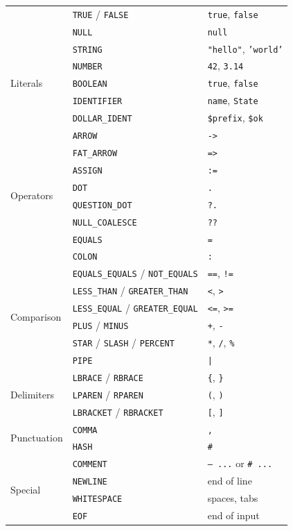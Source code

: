 \documentclass[11pt,a4paper]{article}
\begin{document}
\begin{center}
\begin{tabular}{@{}lll@{}}
& \texttt{TRUE} / \texttt{FALSE} & \texttt{true}, \texttt{false} \\
& \texttt{NULL} & \texttt{null} \\
\midrule
\multirow{5}{*}{Literals}
& \texttt{STRING} & \texttt{"hello"}, \texttt{'world'} \\
& \texttt{NUMBER} & \texttt{42}, \texttt{3.14} \\
& \texttt{BOOLEAN} & \texttt{true}, \texttt{false} \\
& \texttt{IDENTIFIER} & \texttt{name}, \texttt{State} \\
& \texttt{DOLLAR\_IDENT} & \texttt{\$prefix}, \texttt{\$ok} \\
\midrule
\multirow{8}{*}{Operators}
& \texttt{ARROW} & \texttt{->} \\
& \texttt{FAT\_ARROW} & \texttt{=>} \\
& \texttt{ASSIGN} & \texttt{:=} \\
& \texttt{DOT} & \texttt{.} \\
& \texttt{QUESTION\_DOT} & \texttt{?.} \\
& \texttt{NULL\_COALESCE} & \texttt{??} \\
& \texttt{EQUALS} & \texttt{=} \\
& \texttt{COLON} & \texttt{:} \\
\midrule
\multirow{6}{*}{Comparison}
& \texttt{EQUALS\_EQUALS} / \texttt{NOT\_EQUALS} & \texttt{==}, \texttt{!=} \\
& \texttt{LESS\_THAN} / \texttt{GREATER\_THAN} & \texttt{<}, \texttt{>} \\
& \texttt{LESS\_EQUAL} / \texttt{GREATER\_EQUAL} & \texttt{<=}, \texttt{>=} \\
& \texttt{PLUS} / \texttt{MINUS} & \texttt{+}, \texttt{-} \\
& \texttt{STAR} / \texttt{SLASH} / \texttt{PERCENT} & \texttt{*}, \texttt{/}, \texttt{\%} \\
& \texttt{PIPE} & \texttt{|} \\
\midrule
\multirow{3}{*}{Delimiters}
& \texttt{LBRACE} / \texttt{RBRACE} & \texttt{\{}, \texttt{\}} \\
& \texttt{LPAREN} / \texttt{RPAREN} & \texttt{(}, \texttt{)} \\
& \texttt{LBRACKET} / \texttt{RBRACKET} & \texttt{[}, \texttt{]} \\
\midrule
\multirow{2}{*}{Punctuation}
& \texttt{COMMA} & \texttt{,} \\
& \texttt{HASH} & \texttt{\#} \\
\midrule
\multirow{4}{*}{Special}
& \texttt{COMMENT} & \texttt{-- ...} or \texttt{\# ...} \\
& \texttt{NEWLINE} & end of line \\
& \texttt{WHITESPACE} & spaces, tabs \\
& \texttt{EOF} & end of input \\
\bottomrule
\end{tabular}
\end{center}
\end{document}

